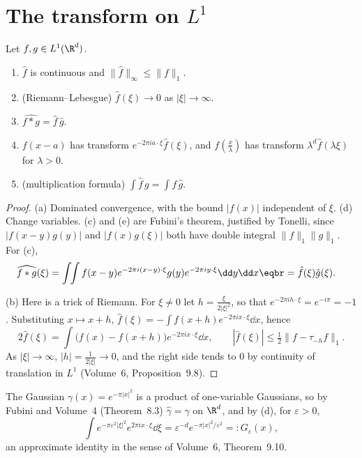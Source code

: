 \section{The transform on \texorpdfstring{$L^1$}{L1}}

\begin{proposition}\label{prop:ftl1}
Let $f,g\in L^1(\R^d)$.
\begin{enumerate}
\item[(a)] $\hat f$ is continuous and $\|\hat f\|_\infty\le\|f\|_1$.
\item[(b)] (Riemann--Lebesgue) $\hat f(\xi)\to0$ as $|\xi|\to\infty$.
\item[(c)] $\widehat{f*g}=\hat f\,\hat g$.
\item[(d)] $f(x-a)$ has transform $e^{-2\pi ia\cdot\xi}\hat f(\xi)$, and $f(\frac x\lambda)$ has transform $\lambda^d\hat f(\lambda\xi)$ for $\lambda>0$.
\item[(e)] (multiplication formula) $\int\hat f\,g=\int f\,\hat g$.
\end{enumerate}
\end{proposition}
\begin{proof}
(a) Dominated convergence, with the bound $|f(x)|$ independent of $\xi$. (d) Change variables. (c) and (e) are Fubini's theorem, justified by Tonelli, since $|f(x-y)g(y)|$ and $|f(x)g(\xi)|$ both have double integral $\|f\|_1\|g\|_1$. For (c),
\[\begin{aligned}\widehat{f*g}(\xi)&=\int\!\!\int f(x-y)e^{-2\pi i(x-y)\cdot\xi}g(y)e^{-2\pi iy\cdot\xi}\dd y\dd x\eqbr=\hat f(\xi)\hat g(\xi).\end{aligned}\]

(b) Here is a trick of Riemann. For $\xi\ne0$ let $h=\frac{\xi}{2|\xi|^2}$, so that $e^{-2\pi ih\cdot\xi}=e^{-i\pi}=-1$. Substituting $x\mapsto x+h$,
$\hat f(\xi)=-\int f(x+h)e^{-2\pi ix\cdot\xi}\dd x$, hence
\[2\hat f(\xi)=\int\bigl(f(x)-f(x+h)\bigr)e^{-2\pi ix\cdot\xi}\dd x,\qquad|\hat f(\xi)|\le\tfrac12\|f-\tau_{-h}f\|_1.\]
As $|\xi|\to\infty$, $|h|=\frac1{2|\xi|}\to0$, and the right side tends to $0$ by continuity of translation in $L^1$ (Volume~6, Proposition~9.8).
\end{proof}

The Gaussian $\gamma(x)=e^{-\pi|x|^2}$ is a product of one-variable Gaussians, so by Fubini and Volume~4 (Theorem~8.3) $\hat\gamma=\gamma$ on $\R^d$, and by (d), for $\varepsilon>0$,
\begin{equation}\label{eq:gaussft}
\int e^{-\pi\varepsilon^2|\xi|^2}e^{2\pi ix\cdot\xi}\dd\xi=\varepsilon^{-d}e^{-\pi|x|^2/\varepsilon^2}=:G_\varepsilon(x),
\end{equation}
an approximate identity in the sense of Volume~6, Theorem~9.10.

